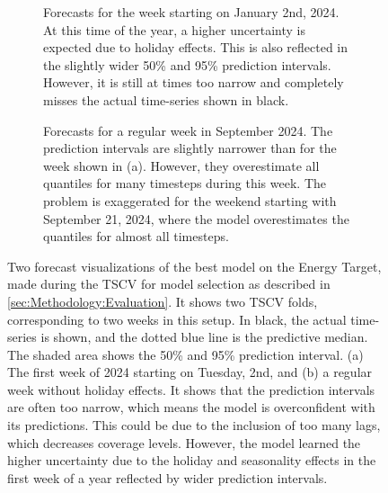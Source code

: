 \begin{figure}[htbp]
    \centering
    \begin{subfigure}[b]{0.95\textwidth}
        \centering
        
        \caption{Forecasts for the week starting on January 2nd, 2024. At this time of the year, a higher uncertainty is expected due to holiday effects. This is also reflected in the slightly wider 50\% and 95\% prediction intervals. However, it is still at times too narrow and completely misses the actual time-series shown in black.}
        \label{fig:forecast-plot-1}
    \end{subfigure}
    \begin{subfigure}[b]{0.95\textwidth}
        \centering
        
        \caption{Forecasts for a regular week in September 2024. The prediction intervals are slightly narrower than for the week shown in (a). However, they overestimate all quantiles for many timesteps during this week. The problem is exaggerated for the weekend starting with September 21, 2024, where the model overestimates the quantiles for almost all timesteps.}
        \label{fig:forecast-plot-2}
    \end{subfigure}
    \caption{Two forecast visualizations of the best model on the Energy Target, made during the TSCV for model selection as described in \cref{sec:Methodology:Evaluation}. It shows two TSCV folds, corresponding to two weeks in this setup. In black, the actual time-series is shown, and the dotted blue line is the predictive median. The shaded area shows the 50\% and 95\% prediction interval. (a) The first week of 2024 starting on Tuesday, 2nd, and (b) a regular week without holiday effects. It shows that the prediction intervals are often too narrow, which means the model is overconfident with its predictions. This could be due to the inclusion of too many lags, which decreases coverage levels. However, the model learned the higher uncertainty due to the holiday and seasonality effects in the first week of a year reflected by wider prediction intervals.}
    \label{fig:Forecast-visualization}
\end{figure}


